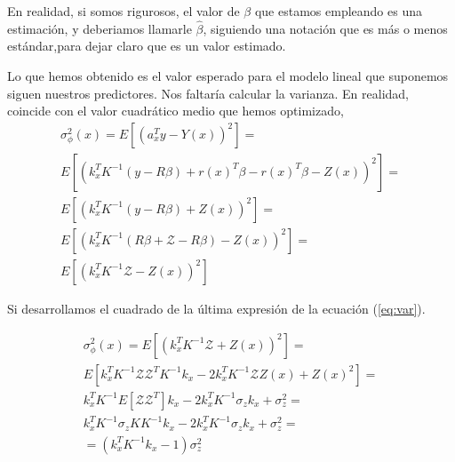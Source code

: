 \documentclass[10pt,a4paper]{report}
\begin{document}
En realidad, si somos rigurosos, el valor de $\beta$ que estamos empleando es una estimación, y deberiamos llamarle $\hat{\beta}$, siguiendo una notación que es más o menos estándar,para dejar claro que es un valor estimado.

Lo que hemos obtenido es el valor esperado para el modelo lineal que suponemos siguen nuestros predictores. Nos faltaría calcular la varianza. En realidad, coincide con el valor cuadrático medio que hemos optimizado,
\begin{equation}\label{eq:var}
\begin{split}
\sigma_{\phi}^2(x) = E[(a_x^Ty-Y(x))^2] =\\
E[(k_x^TK^{-1}(y-R\beta)+r(x)^T\beta-r(x)^T\beta-Z(x))^2] =\\
E[(k_x^TK^{-1}(y-R\beta)+Z(x))^2]=\\
E[(k_x^TK^{-1}(R\beta+\mathcal{Z}-R\beta)-Z(x))^2]=\\
E[(k_x^TK^{-1}\mathcal{Z}-Z(x))^2]
\end{split}
\end{equation}

Si desarrollamos el cuadrado de la última expresión de la ecuación (\ref{eq:var}). 

\begin{equation}
\begin{split}
\sigma_{\phi}^2(x) = E[(k_x^TK^{-1}\mathcal{Z}+Z(x))^2]=\\
E\left[k_x^TK^{-1}\mathcal{Z}\mathcal{Z}^TK^{-1}k_x -2k_x^TK^{-1}\mathcal{Z}Z(x)+ Z(x)^2\right]=\\
k_x^TK^{-1}E[\mathcal{Z}\mathcal{Z}^T]k_x -2k_x^TK^{-1}\sigma_zk_x+\sigma_z^2=\\
k_x^TK^{-1}\sigma_zKK^{-1}k_x - 2k_x^TK^{-1}\sigma_zk_x+\sigma_z^2=\\
= (k_x^TK^{-1}k_x -1)\sigma_z^2
\end{split}
\end{equation}
\end{document}
